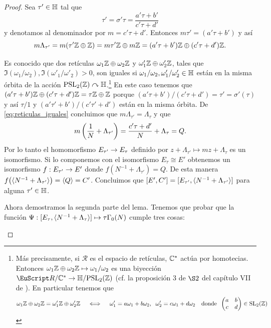 \documentclass[../../tesis_maestria]{subfiles}
\begin{document}
\begin{proof}
Sea $\tau'\in\mathbb{H}$ tal que
\begin{equation}\label{eq:def_de_matriz_sigma}
  \tau'=\sigma'\tau=\frac{a'\tau+b'}{c'\tau+d'}
\end{equation}
y denotamos al denominador por $m=c'\tau+d'$. Entonces $m\tau'=(a'\tau+b')$ y así
\begin{equation}\label{eq:reticulas_iguales}
	m\Lambda_{\tau'}=
	m(\tau'\mathbb{Z}\oplus\mathbb{Z})=
	m\tau'\mathbb{Z}\oplus m\mathbb{Z}=
	(a'\tau+b')\mathbb{Z}\oplus(c'\tau+d')\mathbb{Z}.
\end{equation}

Es conocido que dos retículas $\omega_1\mathbb{Z}\oplus\omega_2\mathbb{Z}$ y $\omega'_1\mathbb{Z}\oplus\omega'_2\mathbb{Z}$, tales que $\Im(\omega_1/\omega_2),\Im(\omega'_1/\omega'_2)>0$, son iguales si $\omega_1/\omega_2,\omega'_1/\omega'_2\in\mathbb{H}$ están en la misma órbita de la acción $\mathrm{PSL}_2(\mathbb{Z})\curvearrowright\mathbb{H}$.\footnote{\label{foot:reticulas}Más precisamente, si $\mathcal{R}$ es el espacio de retículas, $\mathbb{C}^*$ actúa por homotecias. Entonces $\omega_1\mathbb{Z}\oplus\omega_2\mathbb{Z}\mapsto \omega_1/\omega_2$ es una biyección $\mathcal{R}/\CC^*\ra\HH/\PSL_2(\ZZ)$ (cf. la proposición 3 de $\S2$ del capítulo VII de \cite{SerreACIA}). En particular tenemos que
\[
	\omega_1\mathbb{Z}\oplus\omega_2\mathbb{Z}=\omega'_1\mathbb{Z}\oplus\omega'_2\mathbb{Z} \quad\iff\quad
	\omega'_1=a\omega_1+b\omega_2,\;\;\omega'_2=c\omega_1+d\omega_2\quad\text{donde}\;\;\begin{pmatrix}a & b\\ c & d\end{pmatrix}\in\mathrm{SL}_2(\mathbb{Z})
\]} En este caso tenemos que $(a'\tau+b')\mathbb{Z}\oplus(c'\tau+d')\mathbb{Z}=\tau\mathbb{Z}\oplus\mathbb{Z}$ porque $(a'\tau+b')/(c'\tau+d')=\tau'=\sigma'(\tau)$ y así $\tau/1$ y $(a'\tau'+b')/(c'\tau'+d')$ están en la misma órbita. De \eqref{eq:reticulas_iguales} concluimos que $m\Lambda_{\tau'}=\Lambda_{\tau}$ y que
\[
	m\left( \frac{1}{N}+\Lambda_{\tau'} \right)=\frac{c'\tau+d'}{N}+\Lambda_\tau=Q.
\]
Por lo tanto el homomorfismo $E_{\tau'}\rightarrow E_\tau$ definido por $z+\Lambda_{\tau'}\mapsto mz+\Lambda_{\tau}$ es un isomorfismo. Si lo componemos con el isomorfismo $E_\tau\cong E'$ obtenemos un isomorfismo $f:E_{\tau'}\rightarrow E'$ donde $f(N^{-1}+\Lambda_{\tau'})=Q$. De esta manera $f\big(\langle N^{-1}+\Lambda_{\tau'} \rangle\big)=\langle Q \rangle=C'$. Concluimos que $[E',C']=[E_{\tau'},\langle N^{-1}+\Lambda_{\tau'} \rangle]$ para alguna $\tau'\in\mathbb{H}$.

Ahora demostramos la segunda parte del lema. Tenemos que probar que la función $\Psi:[E_\tau,\langle N^{-1}+\Lambda_\tau \rangle]\mapsto\tau\Gamma_0(N)$ cumple tres cosas:
\begin{enumerate}[label=\emph{\roman*})]


\end{enumerate}
\end{proof}
\end{document}
